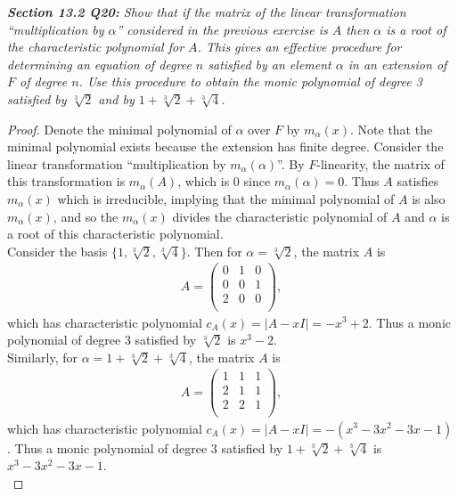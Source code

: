 \documentclass{article}
\begin{document}
\it \textbf{Section 13.2 Q20:} Show that if the matrix of the linear
  transformation ``multiplication by $\alpha$'' considered in the previous
  exercise is $A$ then $\alpha$ is a root of the characteristic polynomial
  for $A$. This gives an effective procedure for determining an equation of
  degree $n$ satisfied by an element $\alpha$ in an extension of $F$ of
  degree $n$. Use this procedure to obtain the monic polynomial of degree 3
  satisfied by $\sqrt[3]{2}$ and by $1+\sqrt[3]{2}+\sqrt[3]{4}$.

  \begin{proof}
    Denote the minimal polynomial of $\alpha$ over $F$ by $m_\alpha(x)$.
    Note that the minimal polynomial exists because the extension has
    finite degree. Consider the linear transformation ``multiplication by
    $m_\alpha(\alpha)$''. By $F$-linearity, the matrix of this
    transformation is $m_\alpha(A)$, which is 0 since $m_\alpha(\alpha)=0$.
    Thus $A$ satisfies $m_\alpha(x)$ which is irreducible, implying that
    the minimal polynomial of $A$ is also $m_\alpha(x)$, and so the
    $m_\alpha(x)$ divides the characteristic polynomial of $A$ and $\alpha$
    is a root of this characteristic polynomial. \\

    Consider the basis $\{1,\sqrt[3]{2},\sqrt[3]{4}\}$. Then for
    $\alpha=\sqrt[3]{2}$, the matrix $A$ is
    \begin{align*}
      A =
      \begin{pmatrix}
        0&1&0\\
        0&0&1\\
        2&0&0\\
      \end{pmatrix},
    \end{align*}
    which has characteristic polynomial $c_A(x)=|A-xI|=-x^3+2$. Thus a
    monic polynomial of degree 3 satisfied by $\sqrt[3]{2}$ is $x^3-2$. \\

    Similarly, for $\alpha=1+\sqrt[3]{2}+\sqrt[3]{4}$, the matrix $A$ is
    \begin{align*}
      A =
      \begin{pmatrix}
        1&1&1\\
        2&1&1\\
        2&2&1\\
      \end{pmatrix},
    \end{align*}
    which has characteristic polynomial $c_A(x)=|A-xI|=-(x^3-3x^2-3x-1)$.
    Thus a monic polynomial of degree 3 satisfied by
    $1+\sqrt[3]{2}+\sqrt[3]{4}$ is $x^3-3x^2-3x-1$. \\
  \end{proof}
\end{document}
